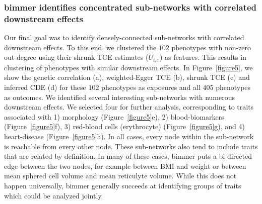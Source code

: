 \documentclass{article}
\begin{document}
\subsubsection*{bimmer identifies concentrated sub-networks with correlated downstream effects}
Our final goal was to identify densely-connected sub-networks with correlated downstream effects.
To this end, we clustered the $102$ phenotypes with non-zero out-degree using their  shrunk TCE estimates ($U_{i, :}$) as features.
This results in clustering of phenotypes with similar downstream effects.
In Figure~\ref{figure5}, we show the genetic correlation (a), weighted-Egger TCE (b), shrunk TCE (c) and
inferred CDE (d) for these $102$ phenotypes as exposures and all $405$ phenotypes as outcomes. We identified several interesting sub-networks with numerous downstream effects. We selected four for further analysis, corresponding to traits associated with 1) morphology (Figure~\ref{figure5}e),
2) blood-biomarkers (Figure~\ref{figure5}f), 3) red-blood cells (erythrocyte) (Figure~\ref{figure5}g), and 4)  heart-disease (Figure~\ref{figure5}h).
In all cases, every node within the sub-network is reachable from every other node. 
These sub-networks also tend to include traits that are related by definition. In many of these cases,
bimmer puts a bi-directed edge between the two nodes, for example between BMI and weight or
between mean sphered cell volume and mean reticulyte volume. While this does not happen universally,
bimmer generally succeeds at identifying groups of traits which could be analyzed jointly. 
\end{document}
